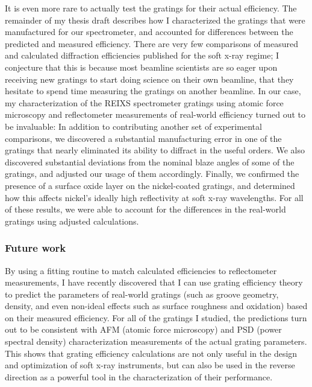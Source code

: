 \documentclass[singlespace,proposal]{uofsthesis-cs}
\begin{document}
It is even more rare to actually test the gratings for their actual efficiency.  The remainder of my thesis draft describes how I characterized the gratings that were manufactured for our spectrometer, and accounted for differences between the predicted and measured efficiency.  There are very few comparisons of measured and calculated diffraction efficiencies published for the soft x-ray regime; I conjecture that this is because most beamline scientists are so eager upon receiving new gratings to start doing science on their own beamline, that they hesitate to spend time measuring the gratings on another beamline.  In our case, my characterization of the REIXS spectrometer gratings using atomic force microscopy and reflectometer measurements of real-world efficiency turned out to be invaluable: In addition to contributing another set of experimental comparisons, we discovered a substantial manufacturing error in one of the gratings that nearly eliminated its ability to diffract in the useful orders.  We also discovered substantial deviations from the nominal blaze angles of some of the gratings, and adjusted our usage of them accordingly.  Finally, we confirmed the presence of a surface oxide layer on the nickel-coated gratings, and determined how this affects nickel's ideally high reflectivity at soft x-ray wavelengths.  For all of these results, we were able to account for the differences in the real-world gratings using adjusted calculations.

\subsubsection{Future work}
By using a fitting routine to match calculated efficiencies to reflectometer measurements, I have recently discovered that I can use grating efficiency theory to predict the parameters of real-world gratings (such as groove geometry, density, and even non-ideal effects such as surface roughness and oxidation) based on their measured efficiency.  For all of the gratings I studied, the predictions turn out to be consistent with AFM (atomic force microscopy) and PSD (power spectral density) characterization measurements of the actual grating parameters.  This shows that grating efficiency calculations are not only useful in the design and optimization of soft x-ray instruments, but can also be used in the reverse direction as a powerful tool in the characterization of their performance.
\end{document}
